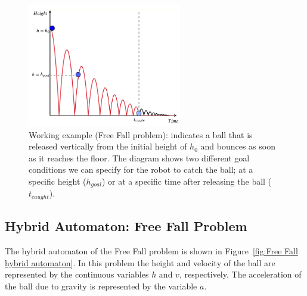 \begin{figure}[!ht]
\centering
\includegraphics[width=0.60\textwidth]{diagrams/Freefall.png}
\caption{Working example (Free Fall problem): indicates a ball that is released vertically from the initial height of $h_0$ and bounces as soon as it reaches the floor. The diagram shows two different goal conditions we can specify for the robot to catch the ball; at a specific height ($h_{goal}$) or at a specific time after releasing the ball ($t_{caught}$).}
\label{fig:Freefall}
\end{figure}




\subsection{Hybrid Automaton: Free Fall Problem}

The hybrid automaton of the Free Fall problem is shown in Figure~\ref{fig:Free Fall hybrid automaton}. In this problem the height and velocity of the ball are represented by the continuous variables $h$ and $v$, respectively. The acceleration of the ball due to gravity is represented by the variable $a$.

